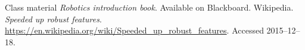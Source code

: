 \begin{thebibliography}{50}
	 Class material \textsl{Robotics introduction book}. Available on Blackboard.
	 Wikipedia. \textsl{Speeded up robust features}.
	\url{https://en.wikipedia.org/wiki/Speeded_up_robust_features}. Accessed 2015--12--18.
\end{thebibliography}
